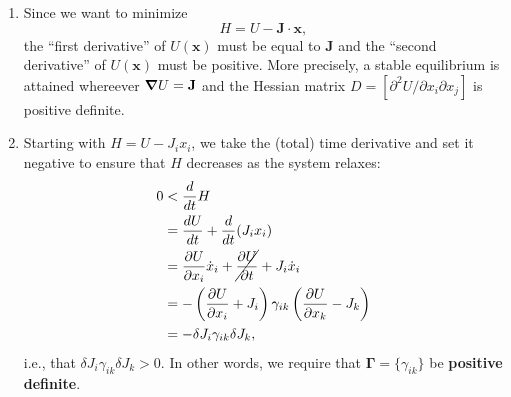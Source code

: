 \documentclass{article}
\theoremstyle{definition}
\newcommand{\p}{\partial}
\newcommand{\f}[2]{\frac{#1}{#2}}
\newcommand{\lp}{\left(}
\newcommand{\rp}{\right)}
\begin{document}
\begin{enumerate}[label=(\alph*)]
	\item Since we want to minimize  
	\begin{equation*}
	H = U - \mathbf{J}\cdot \mathbf{x},
	\end{equation*}
	the ``first derivative'' of $U(\mathbf{x})$ must be equal to $\mathbf{J}$ and the ``second derivative'' of $U(\mathbf{x})$ must be positive. More precisely, a stable equilibrium is attained whereever $\grad U = \mathbf{J}$ and the Hessian matrix $D = [\p^2 U /\p x_i \p x_j]$ is positive definite. 
	
	
	\item Starting with $H = U - J_i x_i$, we take the (total) time derivative and set it negative to ensure that $H$ decreases as the system relaxes:
	\begin{align*}
	0 &< \f{d}{dt}H \\
	&= \f{dU}{dt}   + \f{d}{dt}(J_i x_i) \\
	&= \f{\p U}{\p x_i}\dot{x}_i + \cancel{\f{\p U}{\p t}} + J_i \dot{x}_i\\
	&= -\lp \f{\p U}{\p x_i} + J_i \rp \gamma_{ik} \lp \f{\p U}{\p x_k} - J_k \rp\\
	&= -\delta J_i \gamma_{ik} \delta J_k,
	\end{align*}
	i.e., that $\delta J_i \gamma_{ik} \delta J_k > 0$. In other words, we require that $\mathbf{\Gamma} = \{ \gamma_{ik}\}$ be \textbf{positive definite}. 
	
	
	

\end{enumerate}
\end{document}
